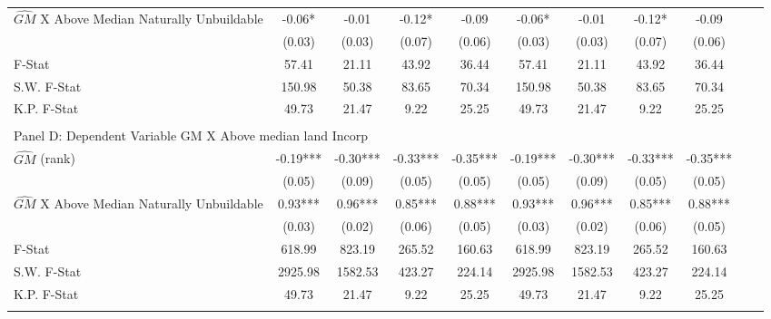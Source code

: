 \begin{table}[htbp]
\begin{threeparttable}
\begin{tabular}{l*{10}{c}}
\addlinespace
$\hat{GM}$ X Above Median Naturally Unbuildable&      -0.06*  &      -0.01   &      -0.12*  &      -0.09   &      -0.06*  &      -0.01   &      -0.12*  &      -0.09   \\
                &     (0.03)   &     (0.03)   &     (0.07)   &     (0.06)   &     (0.03)   &     (0.03)   &     (0.07)   &     (0.06)   \\
\midrule
F-Stat          &      57.41   &      21.11   &      43.92   &      36.44   &      57.41   &      21.11   &      43.92   &      36.44   \\
S.W. F-Stat     &     150.98   &      50.38   &      83.65   &      70.34   &     150.98   &      50.38   &      83.65   &      70.34   \\
K.P. F-Stat     &      49.73   &      21.47   &       9.22   &      25.25   &      49.73   &      21.47   &       9.22   &      25.25   \\
\cmidrule[\heavyrulewidth](lr){1-9} \\ \cmidrule[\heavyrulewidth](lr){1-9}
\multicolumn{8}{l}{Panel D: Dependent Variable GM X Above median land Incorp}\\
\cmidrule(lr){1-9}
$\hat{GM}$ (rank)&      -0.19***&      -0.30***&      -0.33***&      -0.35***&      -0.19***&      -0.30***&      -0.33***&      -0.35***\\
                &     (0.05)   &     (0.09)   &     (0.05)   &     (0.05)   &     (0.05)   &     (0.09)   &     (0.05)   &     (0.05)   \\
\addlinespace
$\hat{GM}$ X Above Median Naturally Unbuildable&       0.93***&       0.96***&       0.85***&       0.88***&       0.93***&       0.96***&       0.85***&       0.88***\\
                &     (0.03)   &     (0.02)   &     (0.06)   &     (0.05)   &     (0.03)   &     (0.02)   &     (0.06)   &     (0.05)   \\
\midrule
F-Stat          &     618.99   &     823.19   &     265.52   &     160.63   &     618.99   &     823.19   &     265.52   &     160.63   \\
S.W. F-Stat     &    2925.98   &    1582.53   &     423.27   &     224.14   &    2925.98   &    1582.53   &     423.27   &     224.14   \\
K.P. F-Stat     &      49.73   &      21.47   &       9.22   &      25.25   &      49.73   &      21.47   &       9.22   &      25.25   \\
\cmidrule[\heavyrulewidth](lr){1-9} \\ \cmidrule[\heavyrulewidth](lr){1-9}

\end{tabular}
\end{threeparttable}
\end{table}
